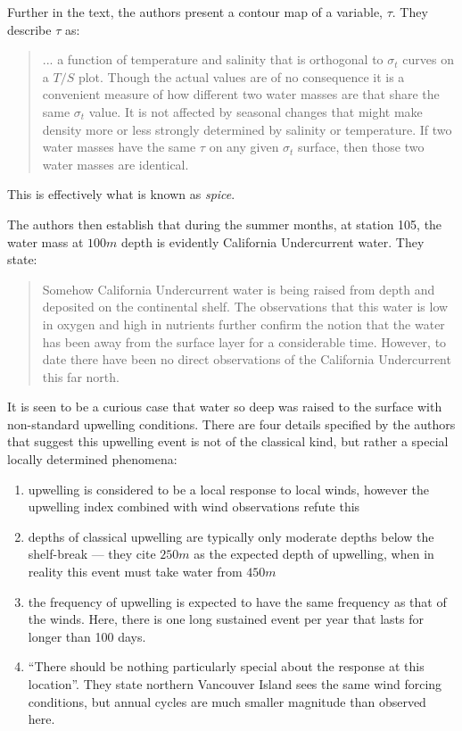 \documentclass[12pt]{extreport}
\begin{document}
Further in the text, the authors present a contour map of a variable, $\tau$. They describe $\tau$ as:
\begin{quote}
... a function of temperature and salinity that is orthogonal to $\sigma_t$ curves on a $T/S$ plot. Though the actual values are of no consequence it is a convenient measure of how different two water masses are that share the same $\sigma_t$ value. It is not affected by seasonal changes that might make density more or less strongly determined by salinity or temperature. If two water masses have the same $\tau$ on any given $\sigma_t$ surface, then those two water masses are identical.
\end{quote}
This is effectively what is known as \textit{spice}. 

The authors then establish that during the summer months, at station 105, the water mass at $100m$ depth is evidently California Undercurrent water. They state: 
\begin{quote}
Somehow California Undercurrent water is being raised from depth and deposited on the continental shelf. The observations that this water is low in oxygen and high in nutrients further confirm the notion that the water has been away from the surface layer for a considerable time. However, to date there have been no direct observations of the California Undercurrent this far north.
\end{quote}

It is seen to be a curious case that water so deep was raised to the surface with non-standard upwelling conditions. There are four details specified by the authors that suggest this upwelling event is not of the classical kind, but rather a special locally determined phenomena:
\begin{enumerate}
\item upwelling is considered to be a local response to local winds, however the upwelling index combined with wind observations refute this
\item depths of classical upwelling are typically only moderate depths below the shelf-break --- they cite $250m$ as the expected depth of upwelling, when in reality this event must take water from $450m$ 
\item the frequency of upwelling is expected to have the same frequency as that of the winds. Here, there is one long sustained event per year that lasts for longer than 100 days.
\item ``There should be nothing particularly special about the response at this location''. They state northern Vancouver Island sees the same wind forcing conditions, but annual cycles are much smaller magnitude than observed here.
\end{enumerate}
\end{document}
